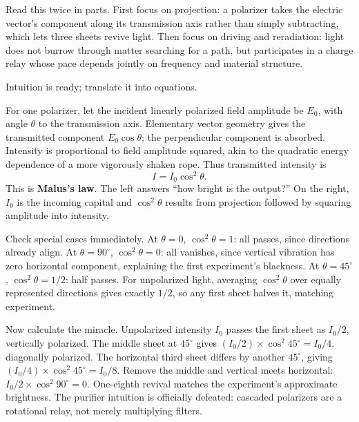 Read this twice in parts. First focus on projection: a polarizer takes the electric vector's component along its transmission axis rather than simply subtracting, which lets three sheets revive light. Then focus on driving and reradiation: light does not burrow through matter searching for a path, but participates in a charge relay whose pace depends jointly on frequency and material structure.


Intuition is ready; translate it into equations.

For one polarizer, let the incident linearly polarized field amplitude be \(E_0\), with angle \(\theta\) to the transmission axis. Elementary vector geometry gives the transmitted component \(E_0\cos\theta\); the perpendicular component is absorbed. Intensity is proportional to field amplitude squared, akin to the quadratic energy dependence of a more vigorously shaken rope. Thus transmitted intensity is
\[
  I = I_0 \cos^2\theta .
\]
This is \textbf{Malus's law}. The left answers ``how bright is the output?'' On the right, \(I_0\) is the incoming capital and \(\cos^2\theta\) results from projection followed by squaring amplitude into intensity.

\begin{center}
\end{center}

Check special cases immediately. At \(\theta=0\), \(\cos^2\theta=1\): all passes, since directions already align. At \(\theta=90^\circ\), \(\cos^2\theta=0\): all vanishes, since vertical vibration has zero horizontal component, explaining the first experiment's blackness. At \(\theta=45^\circ\), \(\cos^2\theta=1/2\): half passes. For unpolarized light, averaging \(\cos^2\theta\) over equally represented directions gives exactly \(1/2\), so any first sheet halves it, matching experiment.

Now calculate the miracle. Unpolarized intensity \(I_0\) passes the first sheet as \(I_0/2\), vertically polarized. The middle sheet at \(45^\circ\) gives \((I_0/2)\times\cos^2 45^\circ = I_0/4\), diagonally polarized. The horizontal third sheet differs by another \(45^\circ\), giving \((I_0/4)\times\cos^2 45^\circ = I_0/8\). Remove the middle and vertical meets horizontal: \(I_0/2\times\cos^2 90^\circ=0\). One-eighth revival matches the experiment's approximate brightness. The purifier intuition is officially defeated: cascaded polarizers are a rotational relay, not merely multiplying filters.

